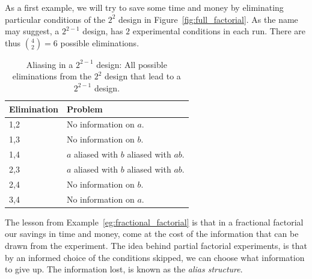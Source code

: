 \begin{example}[From $2^2$ to $2^{(2-1)}$]
\label{eg:fractional_factorial}
As a first example, we will try to save some time and money by eliminating particular conditions of the $2^2$ design in Figure~\ref{fig:full_factorial}.
As the name may suggest, a $2^{2-1}$ design, has $2$ experimental conditions in each run. 
There are thus $\binom{4}{2}=6$ possible eliminations.
\begin{table}[ht]
\begin{tabular}{|p{2.5cm}|p{10cm}|}
\hline Elimination &  Problem \\ 
\hline
\hline 1,2 &  No information on $a$. \\ 
\hline 1,3 &  No information on $b$.\\ 
\hline 1,4 &  $a$ aliased with $b$ aliased with $ab$. \\ 
\hline 2,3 &  $a$ aliased with $b$ aliased with $ab$. \\ 
\hline 2,4 &  No information on $b$. \\ 
\hline 3,4 &  No information on $a$.\\ 
\hline 
\end{tabular} 
\label{tab:partial_factorial}
\caption[Aliasing]{Aliasing in a $2^{2-1}$ design: All possible eliminations from the $2^2$ design that lead to a $2^{2-1}$ design.}
\end{table}
\end{example}

The lesson from Example~\ref{eg:fractional_factorial} is that in a fractional factorial our savings in time and money, come at the cost of the information that can be drawn from the experiment.
The idea behind partial factorial experiments, is that by an informed choice of the conditions skipped, we can choose what information to give up. The information lost, is known as the \emph{alias structure}.

